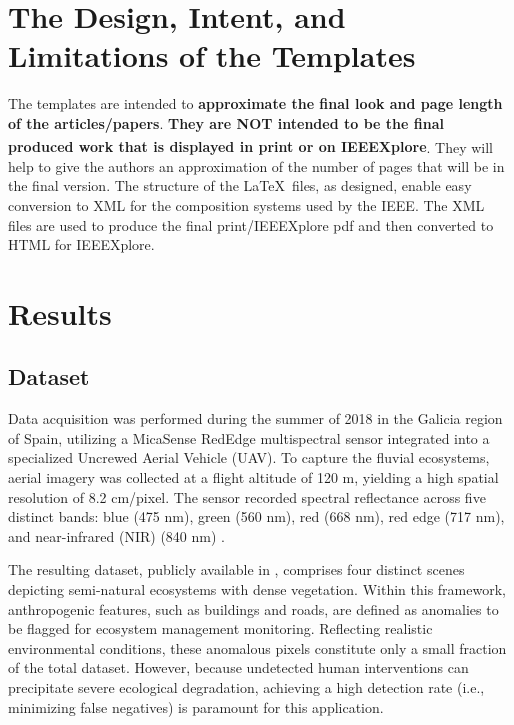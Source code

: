 \documentclass[lettersize,journal]{IEEEtran}
\begin{document}
\section{The Design, Intent, and \\ Limitations of the Templates}
The templates are intended to {\bf{approximate the final look and page length of the articles/papers}}. {\bf{They are NOT intended to be the final produced work that is displayed in print or on IEEEXplore\textsuperscript{\textregistered}}}. They will help to give the authors an approximation of the number of pages that will be in the final version. The structure of the \LaTeX\ files, as designed, enable easy conversion to XML for the composition systems used by the IEEE. The XML files are used to produce the final print/IEEEXplore pdf and then converted to HTML for IEEEXplore.

\section{Results}

\subsection{Dataset}

Data acquisition was performed during the summer of 2018 in the Galicia region of Spain, utilizing a MicaSense RedEdge multispectral sensor integrated into a specialized Uncrewed Aerial Vehicle (UAV). To capture the fluvial ecosystems, aerial imagery was collected at a flight altitude of 120 m, yielding a high spatial resolution of 8.2 cm/pixel. The sensor recorded spectral reflectance across five distinct bands: blue (475 nm), green (560 nm), red (668 nm), red edge (717 nm), and near-infrared (NIR) (840 nm) \cite{arguello2021watershed}.

The resulting dataset, publicly available in \cite{galicianriversaddataset}, comprises four distinct scenes depicting semi-natural ecosystems with dense vegetation. Within this framework, anthropogenic features, such as buildings and roads, are defined as anomalies to be flagged for ecosystem management monitoring. Reflecting realistic environmental conditions, these anomalous pixels constitute only a small fraction of the total dataset. However, because undetected human interventions can precipitate severe ecological degradation, achieving a high detection rate (i.e., minimizing false negatives) is paramount for this application.
\end{document}
